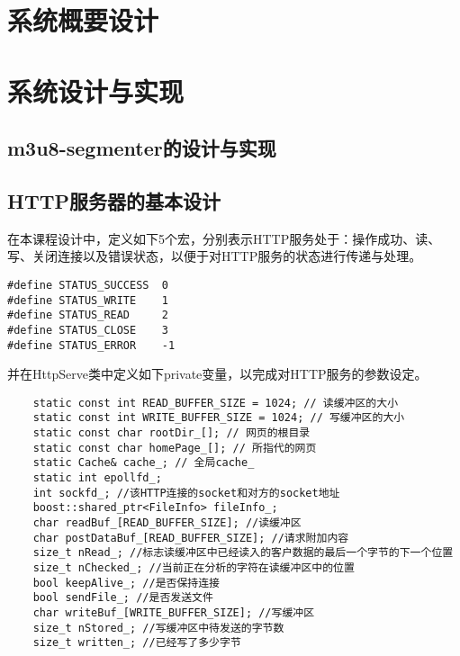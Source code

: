 \documentclass[bachelor]{thesis-uestc}
\begin{document}
\chapter{系统概要设计}

\chapter{系统设计与实现}


\section{m3u8-segmenter的设计与实现}




\section{HTTP服务器的基本设计}
在本课程设计中，定义如下5个宏，分别表示HTTP服务处于：操作成功、读、写、关闭连接以及错误状态，以便于对HTTP服务的状态进行传递与处理。
\begin{lstlisting}
#define STATUS_SUCCESS	0
#define STATUS_WRITE	1
#define STATUS_READ		2
#define STATUS_CLOSE	3
#define STATUS_ERROR	-1
\end{lstlisting}

并在HttpServe类中定义如下private变量，以完成对HTTP服务的参数设定。
\begin{lstlisting}
	static const int READ_BUFFER_SIZE = 1024; // 读缓冲区的大小
	static const int WRITE_BUFFER_SIZE = 1024; // 写缓冲区的大小
	static const char rootDir_[]; // 网页的根目录
	static const char homePage_[]; // 所指代的网页
	static Cache& cache_; // 全局cache_
	static int epollfd_;
	int sockfd_; //该HTTP连接的socket和对方的socket地址
	boost::shared_ptr<FileInfo> fileInfo_;
	char readBuf_[READ_BUFFER_SIZE]; //读缓冲区
	char postDataBuf_[READ_BUFFER_SIZE]; //请求附加内容
	size_t nRead_; //标志读缓冲区中已经读入的客户数据的最后一个字节的下一个位置
	size_t nChecked_; //当前正在分析的字符在读缓冲区中的位置
	bool keepAlive_; //是否保持连接
	bool sendFile_; //是否发送文件
	char writeBuf_[WRITE_BUFFER_SIZE]; //写缓冲区
	size_t nStored_; //写缓冲区中待发送的字节数
	size_t written_; //已经写了多少字节
\end{lstlisting}
\end{document}
